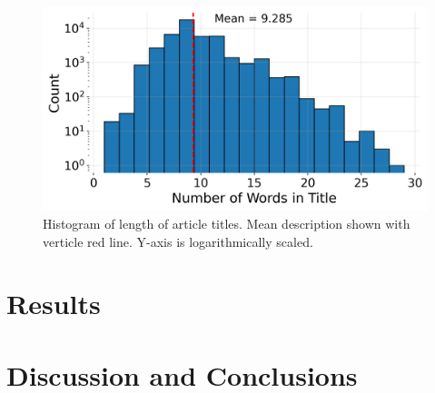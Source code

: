 \documentclass[12pt]{article}
\begin{document}
    \begin{figure}[htbp]
        \centerline{\includegraphics[scale=1]{../results/length_of_description.png}}
        \caption{Histogram of length of article titles. Mean description shown with verticle red line. Y-axis is logarithmically scaled.}
        \label{fig:1}
\end{figure}

	\section{Results}
	
    \lipsum[4]	
	
	\section{Discussion and Conclusions}
	
    \lipsum[5]	
    
    
    \newpage
    \nocite{*}
     
    
	
\end{document}
